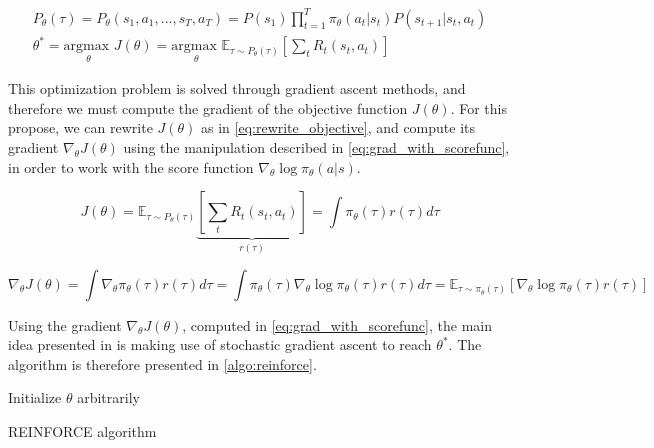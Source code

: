 \begin{align}
P_{\theta}(\tau) = P_{\theta}(s_1,a_1,...,s_T,a_T) = P(s_1)\prod_{t=1}^T{\pi_{\theta}(a_t|s_t) P(s_{t+1}|s_t,a_t)} 
\label{eq:tau_def}
\\
\theta^* = \underset{\theta}{\textrm{argmax }} J(\theta) =
\underset{\theta}{\textrm{argmax }} \mathbb{E}_{\tau \sim P_{\theta}(\tau)} \left[ \sum_t{R_t(s_t,a_t)} \right]
\label{eq:theta_max}
\end{align}

This optimization problem is solved through gradient ascent methods, and therefore we must compute the gradient of the objective function $J(\theta)$. For this propose, we can rewrite $J(\theta)$ as in \ref{eq:rewrite_objective}, and compute its gradient $\nabla_{\theta} J(\theta)$ using the manipulation described in \ref{eq:grad_with_scorefunc}, in order to work with the score function $\nabla_{\theta}\log{\pi_{\theta}(a|s)}$.

\begin{equation}
J(\theta) = \mathbb{E}_{\tau \sim P_{\theta}(\tau)} \underbrace{ \left[ \sum_t{R_t(s_t,a_t)} \right] }_{r(\tau)} = \int{\pi_{\theta}(\tau)r(\tau)d \tau}
\label{eq:rewrite_objective}
\end{equation}

\begin{equation}
\nabla_{\theta} J(\theta) = \int{\nabla_{\theta} \pi_{\theta}(\tau)r(\tau)d \tau} = 
\int{\pi_{\theta}(\tau) \nabla_{\theta} \log{\pi_{\theta}(\tau)} r(\tau)d \tau} =
\mathbb{E}_{\tau \sim \pi_{\theta}(\tau)} \left[ \nabla_{\theta} \log{\pi_{\theta}(\tau)} r(\tau) \right]
\label{eq:grad_with_scorefunc}
\end{equation}

Using the gradient $\nabla_{\theta} J(\theta)$, computed in \ref{eq:grad_with_scorefunc}, the main idea presented in \cite{REINFORCE} is making use of stochastic gradient ascent to reach $\theta^*$. The algorithm is therefore presented in \ref{algo:reinforce}.

\begin{algorithm}[H]
    \DontPrintSemicolon
    \SetAlgoLined
    Initialize $\theta$ arbitrarily\;
    \Return{$\theta$}
    \caption{REINFORCE algorithm}
    \label{algo:reinforce}
\end{algorithm}

